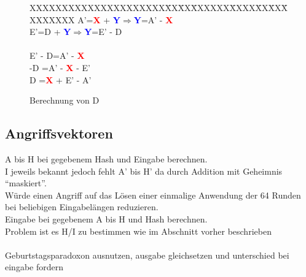 \begin{figure}[!h]
  \begin{tabbing}
    XXXXXXXXXXXXXXXXXXXXX\=XX\=XX\=XXXXXX\=XXXX\=XX\=XX\=XXXXXXXX \kill
    \>A'\>=\>\textcolor{red}{\textbf{X}} + \textcolor{blue}{\textbf{Y}}\>$\Rightarrow$\>\textcolor{blue}{\textbf{Y}}\>=\>A' - \textcolor{red}{\textbf{X}}\\
    \>E'\>=\>D + \textcolor{blue}{\textbf{Y}}\>$\Rightarrow$\>\textcolor{blue}{\textbf{Y}}\>=\>E' - D\\
    \>~\\
    \>\>\>E' - D\>=\>A' - \textcolor{red}{\textbf{X}}\\
    \>\>\>-D    \>=\>A' - \textcolor{red}{\textbf{X}} - E'\\
    \>\>\>D     \>=\>\textcolor{red}{\textbf{X}} + E' - A'
  \end{tabbing}
  \caption{Berechnung von D}
  \label{eq:calcD}
\end{figure}

\subsection{Angriffsvektoren}

A bis H bei gegebenem Hash und Eingabe berechnen.\\
I jeweils bekannt jedoch fehlt A' bis H' da durch Addition mit Geheimnis "`maskiert"'.\\
Würde einen Angriff auf das Lösen einer einmalige Anwendung der 64 Runden bei beliebigen Eingabelängen reduzieren.
~\\
Eingabe bei gegebenem A bis H und Hash berechnen.\\
Problem ist es H/I zu bestimmen wie im Abschnitt vorher beschrieben\\
~\\
Geburtstagsparadoxon ausnutzen, ausgabe gleichsetzen und unterschied bei eingabe fordern